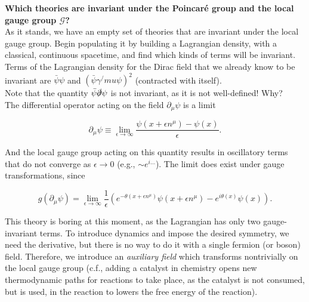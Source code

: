 \noindent \textbf{Which theories are invariant under the Poincar\'e group and the local gauge group $\mathcal{G}$?} \\

\noindent As it stands, we have an empty set of theories that are invariant under the local gauge group. Begin populating it by building a Lagrangian density, with a classical, continuous spacetime, and find which kinds of terms will be invariant. \\

\noindent Terms of the Lagrangian density for the Dirac field that we already know to be invariant are $\bar{\psi}\psi$ and $(\bar{\psi} \gamma^/mu \psi)^2$ (contracted with itself). \\

\noindent Note that the quantity $\bar{\psi} \slashed{\partial} \psi$ is not invariant, as it is not well-defined!  Why? \\

\noindent The differential operator acting on the field $\partial_\mu \psi$ is a limit

\begin{equation}
\partial_\mu \psi \equiv \lim_{\epsilon \rightarrow \infty} \frac{ \psi(x + \epsilon n^\mu) - \psi(x)}{\epsilon}.
\end{equation}

\noindent And the local gauge group acting on this quantity results in oscillatory terms that do not converge as $\epsilon \rightarrow 0$ (e.g., $\sim e^{i\dots}$). The limit does exist under gauge transformations, since

\begin{equation}
g(\partial_\mu \psi) = \lim_{\epsilon \rightarrow \infty} \frac{1}{\epsilon} (e^{- \theta(x + \epsilon n^\mu)} \psi(x + \epsilon n^\mu ) - e^{i \theta(x)} \psi (x) ).
\end{equation}

\noindent This theory is boring at this moment, as the Lagrangian has only two gauge-invariant terms. To introduce dynamics and impose the desired symmetry, we need the derivative, but there is no way to do it with a single fermion (or boson) field. Therefore, we introduce an \textit{auxiliary field} which transforms nontrivially on the local gauge group (c.f., adding a catalyst in chemistry opens new thermodynamic paths for reactions to take place, as the catalyst is not consumed, but is used, in the reaction to lowers the free energy of the reaction). \\

